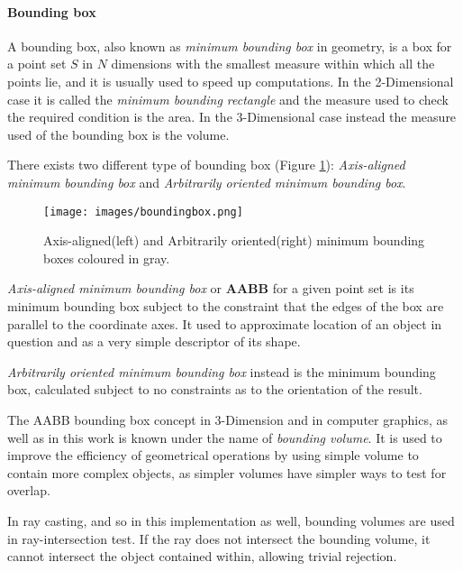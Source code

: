 \documentclass[12pt,a4paper]{extarticle}
\newcommand{\linespace}{\vspace{8pt}}
\begin{document}
\paragraph{Bounding box}

A bounding box, also known as \textit{minimum bounding box} in geometry, is a box for a point set $S$ in $N$ dimensions with the smallest measure within which all the points lie, and it is usually used to speed up computations. In the 2-Dimensional case it is called the \textit{minimum bounding rectangle} and the measure used to check the required condition is the area. In the 3-Dimensional case instead the measure used of the bounding box is the volume.
\linespace

There exists two different type of bounding box (Figure \ref{fig:boundingbox}): \textit{Axis-aligned minimum bounding box} and \textit{Arbitrarily oriented minimum bounding box}.

\begin{figure}[hbtp]
\centering
\texttt{[image: images/boundingbox.png]}
\caption{Axis-aligned(left) and Arbitrarily oriented(right) minimum bounding boxes coloured in gray.}
\label{fig:boundingbox}
\end{figure}


\textit{Axis-aligned minimum bounding box} or \textbf{AABB} for a given point set is its minimum bounding box subject to the constraint that the edges of the box are parallel to the coordinate axes. It used to approximate location of an object in question and as a very simple descriptor of its shape.

\textit{Arbitrarily oriented minimum bounding box} instead is the minimum bounding box, calculated subject to no constraints as to the orientation of the result.
\linespace

The AABB bounding box concept in 3-Dimension and in computer graphics, as well as in this work is known under the name of \textit{bounding volume}. It is used to improve the efficiency of geometrical operations by using simple volume to contain more complex objects, as simpler volumes have simpler ways to test for overlap.

In ray casting, and so in this implementation as well, bounding volumes are used in ray-intersection test. If the ray does not intersect the bounding volume, it cannot intersect the object contained within, allowing trivial rejection.
\end{document}
